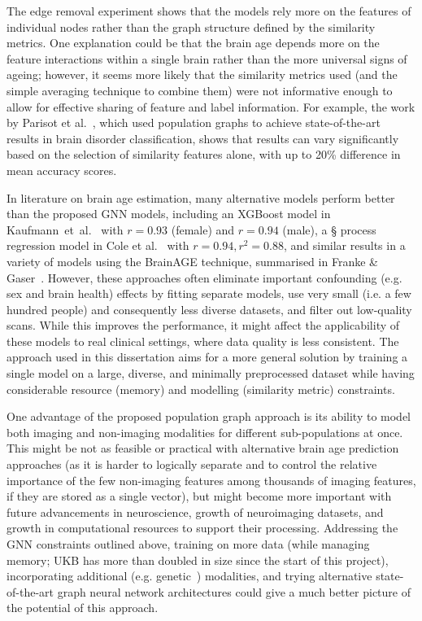 The edge removal experiment shows that the models rely more on the features of individual nodes rather than the graph structure defined by the similarity metrics. One explanation could be that the brain age depends more on the feature interactions within a single brain rather than the more universal signs of ageing; however, it seems more likely that the similarity metrics used (and the simple averaging technique to combine them) were not informative enough to allow for effective sharing of feature and label information. For example, the work by Parisot et al.~\cite{parisot2018disease}, which used population graphs to achieve state-of-the-art results in brain disorder classification, shows that results can vary significantly based on the selection of similarity features alone, with up to 20\% difference in mean accuracy scores. 

In literature on brain age estimation, many alternative models perform better than the proposed GNN models, including an XGBoost model in Kaufmann~et~al.~\cite{kaufmann2019} with $r=0.93$ (female) and $r=0.94$ (male), a § process regression model in Cole et al.~\cite{cole2018brain} with $r=0.94, r^2=0.88$, and similar results in a variety of models using the BrainAGE technique, summarised in Franke \& Gaser~\cite{franke2019ten}. However, these approaches often eliminate important confounding (e.g. sex and brain health) effects by fitting separate models, use very small (i.e. a few hundred people) and consequently less diverse datasets, and filter out low-quality scans. While this improves the performance, it might affect the applicability of these models to real clinical settings, where data quality is less consistent. 
The approach used in this dissertation aims for a more general solution by training a single model on a large, diverse, and minimally preprocessed dataset while having considerable resource (memory) and modelling (similarity metric) constraints. 

One advantage of the proposed population graph approach is its ability to model both imaging and non-imaging modalities for different sub-populations at once. This might be not as feasible or practical with alternative brain age prediction approaches (as it is harder to logically separate and to control the relative importance of the few non-imaging features among thousands of imaging features, if they are stored as a single vector), but might become more important with future advancements in neuroscience, growth of neuroimaging datasets, and growth in computational resources to support their processing. Addressing the GNN constraints outlined above, training on more data (while managing memory; UKB has more than doubled in size since the start of this project), incorporating additional (e.g. genetic~\cite{parisot2018disease}) modalities, and trying alternative state-of-the-art graph neural network architectures could give a much better picture of the potential of this approach.
